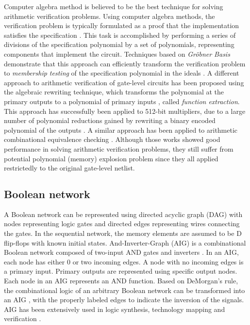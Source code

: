 Computer algebra method is believed to be the best technique for solving arithmetic verification problems. Using computer algebra methods, the verification problem is typically formulated as a proof that the implementation satisfies the specification \cite{ciesielski2015verification}\cite{kalla:tcad13}\cite{STABLE:date11}\cite{sayedformal:date-2016}. This task is accomplished by performing a series of divisions of the specification polynomial by a set of polynomials, representing components that implement the circuit. Techniques based on \textit{Gr{\" o}bner Basis} demonstrate that this approach can efficiently transform the verification problem to \textit{membership testing} of the specification polynomial in the ideals \cite{kalla:tcad13}. A different approach to arithmetic verification of gate-level circuits has been proposed using the algebraic rewriting technique, which transforms the polynomial at the primary outputs to a polynomial of primary inputs \cite{ciesielski2015verification}, called \textit{function extraction}. This approach has successfully been applied to 512-bit multipliers, due to a large number of polynomial reductions gained by rewriting a binary encoded polynomial of the outputs \cite{yu:2016-tcad-verification}. A similar approach has been applied to arithmetic combinational equivalence checking \cite{sayedformal:date-2016}. Although those works showed good performance in solving arithmetic verification problems, they still suffer from potential polynomial (memory) explosion problem since they all applied restrictedly to the original gate-level netlist.


\subsection{Boolean network}
A Boolean network can be represented using directed acyclic graph (DAG) with nodes representing logic gates and directed edges representing wires connecting the gates. In the sequential network, the memory elements are assumed to be D flip-flops with known initial states. And-Inverter-Graph (AIG) is a combinational Boolean network composed of two-input AND gates and inverters \cite{mishchenko:2006-dag}. In an AIG, each node has either 0 or two incoming edges. A node with no incoming edges is a primary input. Primary outputs are represented using specific output nodes. Each node in an AIG represents an AND function. Based on DeMorgan's rule, the combinational logic of an arbitrary Boolean network can be transformed into an AIG \cite{abc-link}, with the properly labeled edges to indicate the inversion of the signals. AIG has been extensively used in logic synthesis, technology mapping \cite{abc-link} and verification \cite{mishchenko2005fraigs-verify}.



